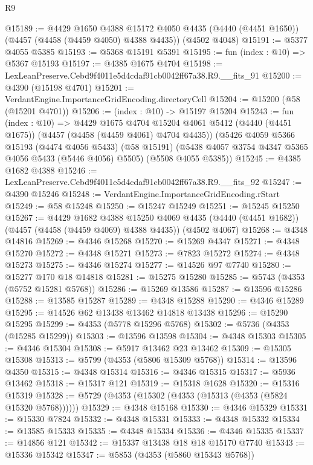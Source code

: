 \begin{lexlean}{R9}
\begin{coremodule}
@15189 := @4429
    @1650
    @4388
    @15172
    @4050
    @4435
    (@4440 (@4451 @1650))
    (@4457 (@4458 (@4459 @4050) @4388 @4435))
    (@4502 @4048)
@15191 := @5377 @4055 @5385
@15193 := @5368 @15191 @5391
@15195 := fun (index : @10) => @5367 @15193
@15197 := @4385 @1675 @4704
@15198 := LexLeanPreserve.Cebd9f4011e5d4cdaf91cb0042ff67a38.R9.__fits_91
@15200 := @4390 (@15198 @4701)
@15201 := VerdantEngine.ImportanceGridEncoding.directoryCell
@15204 := @15200 (@58 (@15201 @4701))
@15206 := (index : @10) -> @15197 @15204
@15243 := fun (index : @10) =>
  @4429
    @1675
    @4704
    @15204
    @4061
    @5412
    (@4440 (@4451 @1675))
    (@4457 (@4458 (@4459 @4061) @4704 @4435))
    (@5426
      @4059
      @5366
      @15193
      (@4474 @4056 @5433)
      (@58 @15191)
      (@5438 @4057 @3754 @4347 @5365 @4056 @5433 (@5446 @4056) @5505)
      (@5508 @4055 @5385))
@15245 := @4385 @1682 @4388
@15246 := LexLeanPreserve.Cebd9f4011e5d4cdaf91cb0042ff67a38.R9.__fits_92
@15247 := @4390 @15246
@15248 := VerdantEngine.ImportanceGridEncoding.rStart
@15249 := @58 @15248
@15250 := @15247 @15249
@15251 := @15245 @15250
@15267 := @4429
    @1682
    @4388
    @15250
    @4069
    @4435
    (@4440 (@4451 @1682))
    (@4457 (@4458 (@4459 @4069) @4388 @4435))
    (@4502 @4067)
@15268 := @4348 @14816
@15269 := @4346 @15268
@15270 := @15269 @4347
@15271 := @4348 @15270
@15272 := @4348 @15271
@15273 := @7823 @15272
@15274 := @4348 @15273
@15275 := @4346 @15274
@15277 := @14526 @97 @7740
@15280 := @15277 @170 @18 @14818
@15281 := @15275 @15280
@15285 := @5743 (@4353 (@5752 @15281 @5768))
@15286 := @15269 @13586
@15287 := @13596 @15286
@15288 := @13585 @15287
@15289 := @4348 @15288
@15290 := @4346 @15289
@15295 := @14526 @62 @13438 @13462 @14818 @13438
@15296 := @15290 @15295
@15299 := @4353 (@5778 @15296 @5768)
@15302 := @5736 (@4353 (@15285 @15299))
@15303 := @13596 @13598
@15304 := @4348 @15303
@15305 := @4346 @15304
@15308 := @5917 @13462 @23 @13462
@15309 := @15305 @15308
@15313 := @5799 (@4353 (@5806 @15309 @5768))
@15314 := @13596 @4350
@15315 := @4348 @15314
@15316 := @4346 @15315
@15317 := @5936 @13462
@15318 := @15317 @121
@15319 := @15318 @1628
@15320 := @15316 @15319
@15328 := @5729 (@4353 (@15302 (@4353 (@15313 (@4353 (@5824 @15320 @5768))))))
@15329 := @4348 @15168
@15330 := @4346 @15329
@15331 := @15330 @7824
@15332 := @4348 @15331
@15333 := @4348 @15332
@15334 := @13585 @15333
@15335 := @4348 @15334
@15336 := @4346 @15335
@15337 := @14856 @121
@15342 := @15337 @13438 @18 @18 @15170 @7740
@15343 := @15336 @15342
@15347 := @5853 (@4353 (@5860 @15343 @5768))

\end{coremodule}
\end{lexlean}

